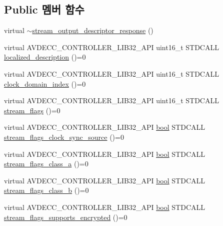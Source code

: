 \subsection*{Public 멤버 함수}
\begin{DoxyCompactItemize}
\item 
virtual \hyperlink{classavdecc__lib_1_1stream__output__descriptor__response_a9459f0ac86e6093bf4c3445a5431802a}{$\sim$stream\+\_\+output\+\_\+descriptor\+\_\+response} ()
\item 
virtual A\+V\+D\+E\+C\+C\+\_\+\+C\+O\+N\+T\+R\+O\+L\+L\+E\+R\+\_\+\+L\+I\+B32\+\_\+\+A\+PI uint16\+\_\+t S\+T\+D\+C\+A\+LL \hyperlink{classavdecc__lib_1_1stream__output__descriptor__response_a1fb9de45567df344090a1407aa6b775f}{localized\+\_\+description} ()=0
\item 
virtual A\+V\+D\+E\+C\+C\+\_\+\+C\+O\+N\+T\+R\+O\+L\+L\+E\+R\+\_\+\+L\+I\+B32\+\_\+\+A\+PI uint16\+\_\+t S\+T\+D\+C\+A\+LL \hyperlink{classavdecc__lib_1_1stream__output__descriptor__response_aab7f93d403d8b73f8f4a8fb7c61ecded}{clock\+\_\+domain\+\_\+index} ()=0
\item 
virtual A\+V\+D\+E\+C\+C\+\_\+\+C\+O\+N\+T\+R\+O\+L\+L\+E\+R\+\_\+\+L\+I\+B32\+\_\+\+A\+PI uint16\+\_\+t S\+T\+D\+C\+A\+LL \hyperlink{classavdecc__lib_1_1stream__output__descriptor__response_aca4a27df506a50c80228271902f0091e}{stream\+\_\+flags} ()=0
\item 
virtual A\+V\+D\+E\+C\+C\+\_\+\+C\+O\+N\+T\+R\+O\+L\+L\+E\+R\+\_\+\+L\+I\+B32\+\_\+\+A\+PI \hyperlink{avb__gptp_8h_af6a258d8f3ee5206d682d799316314b1}{bool} S\+T\+D\+C\+A\+LL \hyperlink{classavdecc__lib_1_1stream__output__descriptor__response_a995e03199cdf8ff67b735e202ee731c9}{stream\+\_\+flags\+\_\+clock\+\_\+sync\+\_\+source} ()=0
\item 
virtual A\+V\+D\+E\+C\+C\+\_\+\+C\+O\+N\+T\+R\+O\+L\+L\+E\+R\+\_\+\+L\+I\+B32\+\_\+\+A\+PI \hyperlink{avb__gptp_8h_af6a258d8f3ee5206d682d799316314b1}{bool} S\+T\+D\+C\+A\+LL \hyperlink{classavdecc__lib_1_1stream__output__descriptor__response_a12f7c478a280c8847869fc1effda0ac9}{stream\+\_\+flags\+\_\+class\+\_\+a} ()=0
\item 
virtual A\+V\+D\+E\+C\+C\+\_\+\+C\+O\+N\+T\+R\+O\+L\+L\+E\+R\+\_\+\+L\+I\+B32\+\_\+\+A\+PI \hyperlink{avb__gptp_8h_af6a258d8f3ee5206d682d799316314b1}{bool} S\+T\+D\+C\+A\+LL \hyperlink{classavdecc__lib_1_1stream__output__descriptor__response_a0c1c9fe75737c0690cefe1597cf0d2f5}{stream\+\_\+flags\+\_\+class\+\_\+b} ()=0
\item 
virtual A\+V\+D\+E\+C\+C\+\_\+\+C\+O\+N\+T\+R\+O\+L\+L\+E\+R\+\_\+\+L\+I\+B32\+\_\+\+A\+PI \hyperlink{avb__gptp_8h_af6a258d8f3ee5206d682d799316314b1}{bool} S\+T\+D\+C\+A\+LL \hyperlink{classavdecc__lib_1_1stream__output__descriptor__response_acf3491baaac1909aeeea303407a15b47}{stream\+\_\+flags\+\_\+supports\+\_\+encrypted} ()=0

\end{DoxyCompactItemize}
